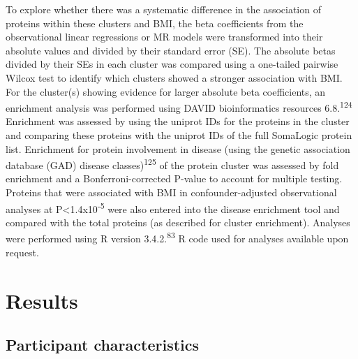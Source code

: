 \documentclass[11pt,twoside]{bristolthesis}
\begin{document}
To explore whether there was a systematic difference in the association of proteins within these clusters and BMI, the beta coefficients from the observational linear regressions or MR models were transformed into their absolute values and divided by their standard error (SE). The absolute betas divided by their SEs in each cluster was compared using a one-tailed pairwise Wilcox test to identify which clusters showed a stronger association with BMI. For the cluster(s) showing evidence for larger absolute beta coefficients, an enrichment analysis was performed using DAVID bioinformatics resources 6.8.\textsuperscript{124} Enrichment was assessed by using the uniprot IDs for the proteins in the cluster and comparing these proteins with the uniprot IDs of the full SomaLogic protein list. Enrichment for protein involvement in disease (using the genetic association database (GAD) disease classes)\textsuperscript{125} of the protein cluster was assessed by fold enrichment and a Bonferroni-corrected P-value to account for multiple testing. Proteins that were associated with BMI in confounder-adjusted observational analyses at P\textless1.4x10\textsuperscript{-5} were also entered into the disease enrichment tool and compared with the total proteins (as described for cluster enrichment). Analyses were performed using R version 3.4.2.\textsuperscript{83} R code used for analyses available upon request.

\hypertarget{results-3}{%
\section{Results}\label{results-3}}

\hypertarget{participant-characteristics-1}{%
\subsection{Participant characteristics}\label{participant-characteristics-1}}
\end{document}
